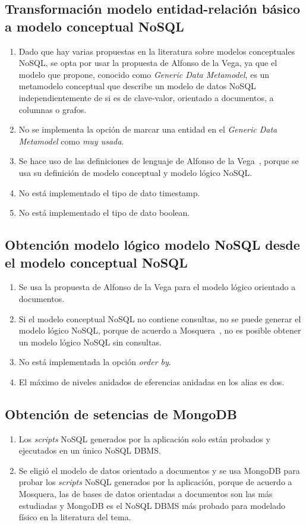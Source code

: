 \subsection*{Transformación modelo entidad-relación básico a modelo conceptual NoSQL}
\begin{enumerate}
    \item Dado que hay varias propuestas en la literatura sobre modelos conceptuales NoSQL, se opta por usar la propuesta de Alfonso de la Vega\cite{de_la_vega_mortadelo_2020}, ya que el modelo que propone, conocido como \textit{Generic Data Metamodel}, es un metamodelo conceptual que describe un modelo de datos NoSQL independientemente de si es de clave-valor, orientado a documentos, a columnas o grafos.
    \item No se implementa la opción de marcar una entidad en el \textit{Generic Data Metamodel} como \textit{muy usada}.
    \item Se hace uso de las definiciones de lenguaje de Alfonso de la Vega~\cite{de_la_vega_mortadelo_2020}, porque se usa su definición de modelo conceptual y modelo lógico NoSQL.
    \item No está implementado el tipo de dato timestamp.
    \item No está implementado el tipo de dato boolean.
\end{enumerate}

\subsection*{Obtención modelo lógico modelo NoSQL desde el modelo conceptual NoSQL}
\begin{enumerate}
    \item Se usa la propuesta de Alfonso de la Vega\cite{de_la_vega_mortadelo_2020} para el modelo lógico orientado a documentos.
    \item Si el modelo conceptual NoSQL no contiene consultas, no se puede generar el modelo lógico NoSQL, porque de acuerdo a Mosquera~\cite{martinez-mosquera_modeling_2020}, no es posible obtener un modelo lógico NoSQL sin consultas.
    \item No está implementada la opción \textit{order by}.
    \item El máximo de niveles anidados de eferencias anidadas en los alias es dos. 
\end{enumerate}

\subsection*{Obtención de setencias de MongoDB}
\begin{enumerate}
    \item Los \textit{scripts} NoSQL generados por la aplicación solo están probados y ejecutados en un único NoSQL DBMS.
    \item Se eligió el modelo de datos orientado a documentos y se usa MongoDB para probar los \textit{scripts} NoSQL generados por la aplicación, porque de acuerdo a Mosquera\cite{martinez-mosquera_modeling_2020}, las de bases de datos orientadas a documentos son las más estudiadas y MongoDB es el NoSQL DBMS más probado para modelado físico en la literatura del tema.
\end{enumerate}
    